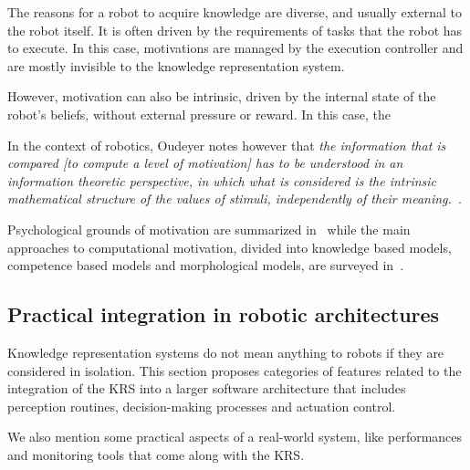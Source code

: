 The reasons for a robot to acquire knowledge are diverse, and usually external
to the robot itself. It is often driven by the requirements of tasks that the
robot has to execute. In this case, motivations are managed by the execution
controller and are mostly invisible to the knowledge representation system.

However, motivation can also be intrinsic, driven by the internal state of the
robot's beliefs, without external pressure or reward. In this case, the 

In the context of robotics, Oudeyer notes however that \emph{the information that is
compared \emph{[to compute a level of motivation]} has to be understood in an
information theoretic perspective, in which what is considered is the intrinsic
mathematical structure of the values of stimuli, independently of their
meaning.}~\cite{Oudeyer2007}.

Psychological grounds of motivation are summarized in~\cite{Oudeyer2007} while
the main approaches to computational motivation, divided into knowledge based
models, competence based models and morphological models, are surveyed
in~\cite{Oudeyer2008}.

\subsection{Practical integration in robotic architectures}
\label{sect|integration-robot}

\begin{scriptsize}
\begin{center}
\end{center}
\end{scriptsize}


Knowledge representation systems do not mean anything to robots if they are
considered in isolation. This section proposes categories of features related
to the integration of the KRS into a larger software architecture that includes
perception routines, decision-making processes and actuation control.

We also mention some practical aspects of a real-world system, like
performances and monitoring tools that come along with the KRS.

